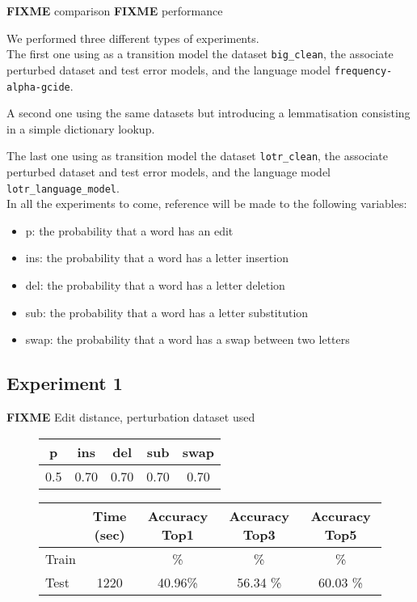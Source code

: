 \textbf{FIXME} comparison
\textbf{FIXME} performance

We performed three different types of experiments. \\

The first one using as a transition model the dataset \texttt{big\_clean}, the associate perturbed dataset and test error 
models, and the language model \texttt{frequency-alpha-gcide}.

A second one using the same datasets but introducing a lemmatisation consisting in a simple dictionary lookup.

The last one using as transition model the dataset \texttt{lotr\_clean}, the associate perturbed dataset and test error 
models, and the language model \texttt{lotr\_language\_model}.\\

In all the experiments to come, reference will be made to the following variables:
\begin{itemize}
	\item p: the probability that a word has an edit
	\item ins: the probability that a word has a letter insertion
	\item del: the probability that a word has a letter deletion
	\item sub: the probability that a word has a letter substitution
	\item swap: the probability that a word has a swap between two letters
\end{itemize}

\subsection{Experiment 1}

\textbf{FIXME}
Edit distance, perturbation dataset used


\begin{figure}[H]
	\centering
	\begin{tabular}{ccccc}
		\toprule
		p 				 & ins 				 	& del  				&  sub 			   &   swap\\ \midrule
		\num{0.5} & \num{0,70} & \num{0,70}  & \num{0,70} & \num{0,70}\\
		\bottomrule
	\end{tabular}
	\label{tab:error_model1}
\end{figure}

\begin{figure}[H]
	\centering
	\begin{tabular}{lcccc}
		\toprule
		& Time (sec)  & Accuracy Top1 & Accuracy Top3  &  Accuracy Top5 \\
		\midrule
		Train & \num{} & \%  &  \% &  \%  \\
		Test &	\num{1220}  & \num{40,96}\%  & \num{56,34} \% & \num{60,03} \%  \\
		\bottomrule
	\end{tabular}
	\label{tab:typo-eval1}
\end{figure}


